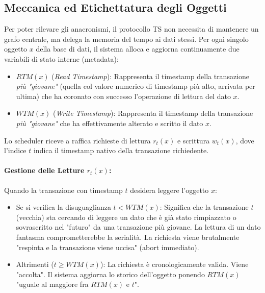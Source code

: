 \subsection{Meccanica ed Etichettatura degli Oggetti}
Per poter rilevare gli anacronismi, il protocollo TS non necessita di mantenere un grafo centrale, ma delega la memoria del tempo ai dati stessi. Per ogni singolo oggetto $x$ della base di dati, il sistema alloca e aggiorna continuamente due variabili di stato interne (metadata):
\begin{itemize}
    \item $RTM(x)$ (\textit{Read Timestamp}): Rappresenta il timestamp della transazione \textit{più "giovane"} (quella col valore numerico di timestamp più alto, arrivata per ultima) che ha coronato con successo l'operazione di lettura del dato $x$.
    \item $WTM(x)$ (\textit{Write Timestamp}): Rappresenta il timestamp della transazione \textit{più "giovane"} che ha effettivamente alterato e scritto il dato $x$.
\end{itemize}

Lo scheduler riceve a raffica richieste di lettura $r_t(x)$ e scrittura $w_t(x)$, dove l'indice $t$ indica il timestamp nativo della transazione richiedente.

\paragraph{Gestione delle Letture $r_t(x)$:}
Quando la transazione con timestamp $t$ desidera leggere l'oggetto $x$:
\begin{itemize}
    \item Se si verifica la disuguaglianza $t < WTM(x)$: Significa che la transazione $t$ (vecchia) sta cercando di leggere un dato che è già stato rimpiazzato o sovrascritto nel "futuro" da una transazione più giovane. La lettura di un dato fantasma comprometterebbe la serialità. La richiesta viene brutalmente "respinta e la transazione viene uccisa" (abort immediato).
    \item Altrimenti ($t \geq WTM(x)$): La richiesta è cronologicamente valida. Viene "accolta". Il sistema aggiorna lo storico dell'oggetto ponendo $RTM(x)$ "uguale al maggiore fra $RTM(x)$ e $t$".
\end{itemize}

